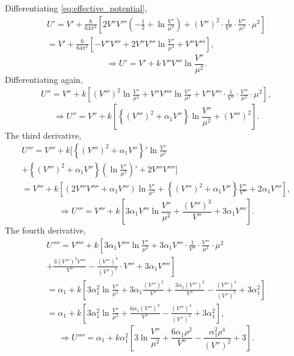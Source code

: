 Differentiating \eqref{eq:effective_potential},
\begin{multline}
    U' = V' + \frac{\hbar}{64\pi^2}\left[2V''V'''\!\left(-\frac{1}{2}
    + \ln\frac{V''}{\mu^2}\right)
    + (V'')^2\cdot\frac{1}{V''}\cdot\frac{V'''}{\mu^2}\cdot\mu^2\right] \\
    = V' + \frac{\hbar}{64\pi^2}\left[-V''V''' + 2V''V'''\ln\frac{V''}{\mu^2}
    + V''V'''\right],
\end{multline}
\begin{equation}
    \Rightarrow U' = V' + k\,V''V'''\ln\frac{V''}{\mu^2}.
    \label{eq:Uprime}
\end{equation}
Differentiating again,
\begin{multline}
    U'' = V'' + k\left[(V''')^2\ln\frac{V''}{\mu^2}
    + V''V''''\ln\frac{V''}{\mu^2}
    + V''V'''\cdot\frac{1}{V''}\cdot\frac{V'''}{\mu^2}\cdot\mu^2\right],
\end{multline}
\begin{equation}
    \Rightarrow U'' = V'' + k\left[\left\{(V''')^2
    + \alpha_1 V''\right\}\ln\frac{V''}{\mu^2} + (V''')^2\right].
\end{equation}
The third derivative,
\begin{multline}
    U''' = V''' + k\Bigg[\left\{(V''')^2 + \alpha_1 V''\right\}'
    \ln\frac{V''}{\mu^2} \\
    + \left\{(V''')^2 + \alpha_1 V''\right\}
    \left(\ln\frac{V''}{\mu^2}\right)' + 2V'''V''''\Bigg] \\
    = V''' + k\left[\left(2V'''V'''' + \alpha_1 V'''\right)
    \ln\frac{V''}{\mu^2}
    + \left\{(V''')^2 + \alpha_1 V''\right\}\frac{V'''}{V''}
    + 2\alpha_1 V'''\right],
\end{multline}
\begin{equation}
    \Rightarrow U''' = V''' + k\left[3\alpha_1 V'''\ln\frac{V''}{\mu^2}
    + \frac{(V''')^3}{V''} + 3\alpha_1 V'''\right].
    \label{eq:Uprimeprimeprime}
\end{equation}
The fourth derivative,
\begin{multline}
    U'''' = V'''' + k\left[3\alpha_1 V''''\ln\frac{V''}{\mu^2}
    + 3\alpha_1 V'''\cdot\frac{1}{V''}\cdot\frac{V'''}{\mu^2}\cdot\mu^2
    \right. \\
    \left. + \frac{3(V''')^2 V''''}{V''}
    - \frac{(V''')^3}{(V'')^2}\cdot V''' + 3\alpha_1 V''''\right] \\
    = \alpha_1 + k\left[3\alpha_1^2\ln\frac{V''}{\mu^2}
    + 3\alpha_1\frac{(V''')^2}{V''}
    + \frac{3\alpha_1(V''')^2}{V''}
    - \frac{(V''')^4}{(V'')^2} + 3\alpha_1^2\right] \\
    = \alpha_1 + k\left[3\alpha_1^2\ln\frac{V''}{\mu^2}
    + \frac{6\alpha_1(V''')^2}{V''}
    - \frac{(V''')^4}{(V'')^2} + 3\alpha_1^2\right],
\end{multline}
\begin{equation}
    \Rightarrow U'''' = \alpha_1 + k\alpha_1^2\left[3\ln\frac{V''}{\mu^2}
    + \frac{6\alpha_1\rho^2}{V''}
    - \frac{\alpha_1^2\rho^4}{(V'')^2} + 3\right].
    \label{eq:Uprrrr}
\end{equation}

